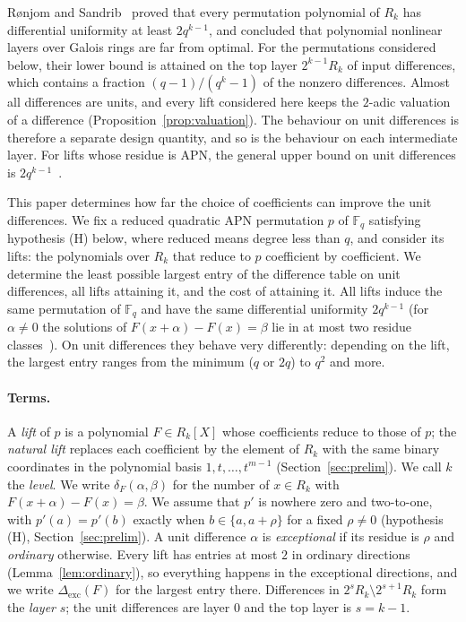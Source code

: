 \documentclass[11pt]{article}
\theoremstyle{definition}
\theoremstyle{remark}
\newcommand{\F}{\mathbb{F}}
\newcommand{\Dexc}{\Delta_{\mathrm{exc}}}
\begin{document}
Rønjom and Sandrib~\cite{RS} proved that every permutation polynomial of $R_k$ has differential uniformity at least
$2q^{k-1}$, and concluded that polynomial nonlinear layers over Galois rings are far from optimal. For the permutations considered below, their lower bound is
attained on the top layer $2^{k-1}R_k$ of input differences, which contains a fraction $(q-1)/(q^k-1)$ of the nonzero
differences. Almost all differences are units, and every lift considered here keeps the $2$-adic valuation of a
difference (Proposition~\ref{prop:valuation}). The behaviour on unit differences is therefore a separate design quantity, and so is
the behaviour on each intermediate layer. For lifts whose residue is APN, the general upper bound on unit differences is
$2q^{k-1}$~\cite[Prop.~4(1)]{RS}.

This paper determines how far the choice of coefficients can improve the unit differences. We fix a reduced quadratic
APN permutation $p$ of $\F_q$ satisfying hypothesis (H) below, where reduced means degree less than $q$, and consider its lifts: the
polynomials over $R_k$ that reduce to $p$ coefficient by coefficient. We determine the least possible largest entry of
the difference table on unit differences, all lifts attaining it, and the cost of attaining it. All lifts induce the same permutation of $\F_q$ and have the same differential uniformity $2q^{k-1}$
(for $\alpha\ne0$ the solutions of $F(x+\alpha)-F(x)=\beta$ lie in at most two residue classes~\cite{RS,Fukui1}). On
unit differences they behave very differently: depending on the lift, the largest entry ranges from the minimum ($q$ or $2q$) to
$q^2$ and more.

\paragraph{Terms.}
A \emph{lift} of $p$ is a polynomial $F\in R_k[X]$ whose coefficients reduce to those of $p$; the \emph{natural lift}
replaces each coefficient by the element of $R_k$ with the same binary coordinates in the polynomial basis
$1,t,\dots,t^{m-1}$ (Section~\ref{sec:prelim}). We call $k$ the \emph{level}. We write $\delta_F(\alpha,\beta)$ for the number of
$x\in R_k$ with $F(x+\alpha)-F(x)=\beta$. We assume that $p'$ is nowhere zero and two-to-one, with $p'(a)=p'(b)$ exactly
when $b\in\{a,a+\rho\}$ for a fixed $\rho\ne0$ (hypothesis (H), Section~\ref{sec:prelim}). A unit difference $\alpha$ is
\emph{exceptional} if its residue is $\rho$ and \emph{ordinary} otherwise. Every lift has entries at most $2$ in
ordinary directions (Lemma~\ref{lem:ordinary}), so everything happens in the exceptional directions, and we write
$\Dexc(F)$ for the largest entry there. Differences in $2^sR_k\setminus2^{s+1}R_k$ form the \emph{layer} $s$; the unit
differences are layer $0$ and the top layer is $s=k-1$.
\end{document}

